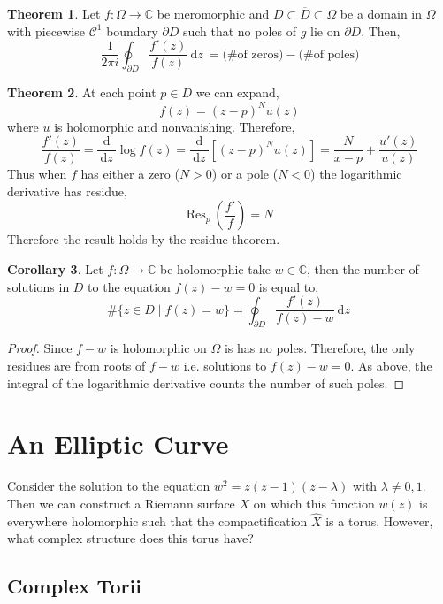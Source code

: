 \documentclass[12pt]{extarticle}
\newcommand{\C}{\mathbb{C}}
\renewcommand{\d}[1]{\: \mathrm{d}#1 \:}
\newcommand{\deriv}[2]{\frac{\d{#1}}{\d{#2}}}
\theoremstyle{definition}
\newtheorem{theorem}{Theorem}[section]
\newtheorem{corollary}[theorem]{Corollary}
\newcommand{\Res}[2]{\mathrm{Res}_{#1} \: #2}
\begin{document}
\begin{theorem}
Let $f : \Omega \to \C$ be meromorphic and $D \subset \overline{D} \subset \Omega$ be a domain in $\Omega$ with piecewise $\mathcal{C}^1$ boundary $\partial D$ such that no poles of $g$ lie on $\partial D$. Then,
\[ 
\frac{1}{2 \pi i} \oint_{\partial D} \frac{f'(z)}{f(z)} \d{z} = \text{(\# of zeros)} - \text{(\# of poles)}
\]
\end{theorem}

\begin{theorem}
At each point $p \in D$ we can expand,
\[ f(z) = (z - p)^N u(z) \]
where $u$ is holomorphic and nonvanishing. Therefore,
\[ \frac{f'(z)}{f(z)} = \deriv{}{z} \log{f(z)} = \deriv{}{z} \left[ (z - p)^N u(z) \right] = \frac{N}{x - p} + \frac{u'(z)}{u(z)} \]
Thus when $f$ has either a zero ($N > 0$) or a pole ($N < 0$) the logarithmic derivative has residue,
\[ \Res{p}{\left(\frac{f'}{f}\right)} = N \]
Therefore the result holds by the residue theorem. 
\end{theorem}

\begin{corollary}
Let $f : \Omega \to \C$ be holomorphic take $w \in \C$, then the number of solutions in $D$ to the equation $f(z) - w = 0$ is equal to,
\[ \#\{ z \in D \mid f(z) = w \} = \oint_{\partial D} \frac{f'(z)}{f(z) - w} \d{z}  \]
\end{corollary}

\begin{proof}
Since $f - w$ is holomorphic on $\Omega$ is has no poles. Therefore, the only residues are from roots of $f - w$ i.e. solutions to $f(z) - w = 0$. As above, the integral of the logarithmic derivative counts the number of such poles.  
\end{proof}

\section{An Elliptic Curve}

Consider the solution to the equation $w^2 = z (z - 1)(z - \lambda)$ with $\lambda \neq 0, 1$. Then we can construct a Riemann surface $X$ on which this function $w(z)$ is everywhere holomorphic such that the compactification $\hat{X}$ is a torus. However, what complex structure does this torus have?

\subsection{Complex Torii} 
\end{document}
